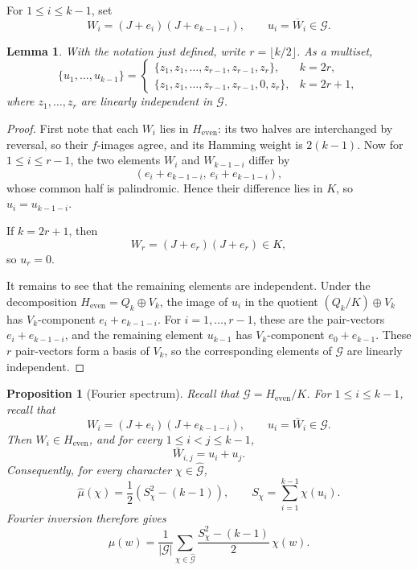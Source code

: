 \documentclass[11pt]{article}
\newtheorem{lemma}[theorem]{Lemma}
\newtheorem{proposition}[theorem]{Proposition}
\theoremstyle{definition}
\theoremstyle{remark}
\begin{document}
For \(1\le i\le k-1\), set
\[
W_i=(J+e_i)(J+e_{k-1-i}),\qquad u_i=\overline W_i\in\mathcal G.
\]

\begin{lemma}\label{lem:ui-multiset}
With the notation just defined, write \(r=\lfloor k/2\rfloor\). As a multiset,
\[
\{u_1,\dots,u_{k-1}\}
=
\begin{cases}
\{z_1,z_1,\dots,z_{r-1},z_{r-1},z_r\}, & k=2r,\\[2mm]
\{z_1,z_1,\dots,z_{r-1},z_{r-1},0,z_r\}, & k=2r+1,
\end{cases}
\]
where \(z_1,\dots,z_r\) are linearly independent in \(\mathcal G\).
\end{lemma}

\begin{proof}
First note that each \(W_i\) lies in \(H_{\mathrm{even}}\): its two halves are interchanged by reversal, so their \(f\)-images agree, and its Hamming weight is \(2(k-1)\). Now for \(1\le i\le r-1\), the two elements \(W_i\) and \(W_{k-1-i}\) differ by
\[
(e_i+e_{k-1-i},\,e_i+e_{k-1-i}),
\]
whose common half is palindromic. Hence their difference lies in \(K\), so \(u_i=u_{k-1-i}\).

If \(k=2r+1\), then
\[
W_r=(J+e_r)(J+e_r)\in K,
\]
so \(u_r=0\).

It remains to see that the remaining elements are independent. Under the decomposition \(H_{\mathrm{even}}=Q_k\oplus V_k\), the image of \(u_i\) in the quotient \((Q_k/K)\oplus V_k\) has \(V_k\)-component \(e_i+e_{k-1-i}\). For \(i=1,\dots,r-1\), these are the pair-vectors \(e_i+e_{k-1-i}\), and the remaining element \(u_{k-1}\) has \(V_k\)-component \(e_0+e_{k-1}\). These \(r\) pair-vectors form a basis of \(V_k\), so the corresponding elements of \(\mathcal G\) are linearly independent.
\end{proof}

\begin{proposition}[Fourier spectrum]\label{prop:fourier}
Recall that \(\mathcal G=H_{\mathrm{even}}/K\). For \(1\le i\le k-1\), recall that
\[
W_i=(J+e_i)(J+e_{k-1-i}),\qquad u_i=\bar W_i\in\mathcal G.
\]
Then \(W_i\in H_{\mathrm{even}}\), and for every \(1\le i<j\le k-1\),
\begin{equation}\label{eq:coset-additive}
\bar W_{i,j}=u_i+u_j.
\end{equation}
Consequently, for every character \(\chi\in\widehat{\mathcal G}\),
\begin{equation}\label{eq:fourier-coeff}
\widehat\mu(\chi)
=
\frac12\left(S_\chi^2-(k-1)\right),
\qquad
S_\chi=\sum_{i=1}^{k-1}\chi(u_i).
\end{equation}
Fourier inversion therefore gives
\begin{equation}\label{eq:fourier-inversion}
\mu(w)
=
\frac1{|\mathcal G|}
\sum_{\chi\in\widehat{\mathcal G}}
\frac{S_\chi^2-(k-1)}{2}\,\chi(w).
\end{equation}
\end{proposition}
\end{document}
